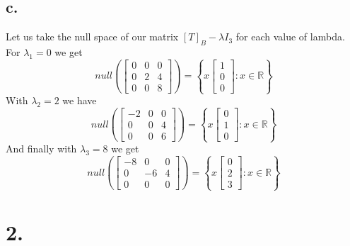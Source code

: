 \documentclass{article}
\begin{document}
	\subsection*{c.}
		Let us take the null space of our matrix $[T]_B - \lambda I_3$ for each value of lambda. For $\lambda_1 = 0$ we get 
		\[ null\left( \begin{bmatrix}0&0&0\\0&2&4\\0&0&8\end{bmatrix} \right) =  \left \{ x \begin{bmatrix}1\\0\\0\end{bmatrix} : x \in \mathbb{R} \right\} \]
		With $\lambda_2 = 2$ we have 
		\[ null\left( \begin{bmatrix}-2&0&0\\0&0&4\\0&0&6\end{bmatrix} \right) =  \left \{ x \begin{bmatrix}0\\1\\0\end{bmatrix} : x \in \mathbb{R} \right\} \]
		And finally with $\lambda_3 = 8$ we get 
		\[ null\left( \begin{bmatrix}-8&0&0\\0&-6&4\\0&0&0\end{bmatrix} \right) =  \left \{ x \begin{bmatrix}0\\2\\3\end{bmatrix} : x \in \mathbb{R} \right\} \]

\section*{2.}
\end{document}
